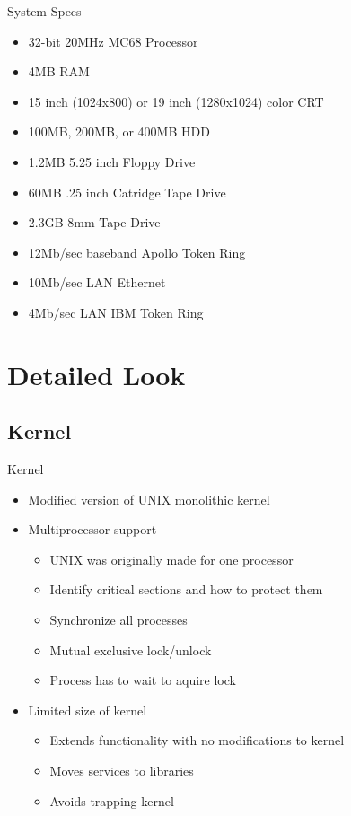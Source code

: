 \documentclass{beamer}
\begin{document}
\begin{frame}{System Specs}
	\begin{itemize}
	\item 32-bit 20MHz MC68 Processor
	\item 4MB RAM
	\item 15 inch (1024x800) or 19 inch (1280x1024) color CRT
	\item 100MB, 200MB, or 400MB HDD
	\item 1.2MB 5.25 inch Floppy Drive
	\item 60MB .25 inch Catridge Tape Drive
	\item 2.3GB 8mm Tape Drive
	\item 12Mb/sec baseband Apollo Token Ring
	\item 10Mb/sec LAN Ethernet
	\item 4Mb/sec LAN IBM Token Ring
	\end{itemize}
\end{frame}

\section{Detailed Look}

\subsection{Kernel}

\begin{frame}{Kernel}
	\begin{itemize}
	\item Modified version of UNIX monolithic kernel
	\item Multiprocessor support
		\begin{itemize}
		\item UNIX was originally made for one processor
		\item Identify critical sections and how to protect them
		\item Synchronize all processes
		\item Mutual exclusive lock/unlock
		\item Process has to wait to aquire lock
		\end{itemize}
	\item Limited size of kernel
		\begin{itemize}
		\item Extends functionality with no modifications to kernel
		\item Moves services to libraries
		\item Avoids trapping kernel
		\end{itemize}
	\end{itemize} 
\end{frame}
\end{document}
